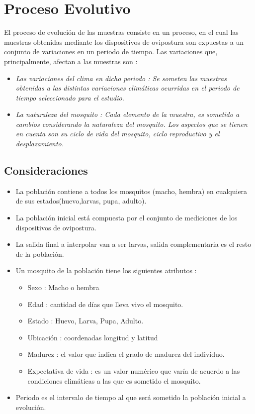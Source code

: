 \section{Proceso Evolutivo}
\label{sec:solucion-evolutivo}

El proceso de evolución de las muestras consiste en un proceso, en el cual
las muestras obtenidas mediante los dispositivos de ovipostura  son
expuestas a un conjunto de variaciones en un periodo de tiempo. Las
variaciones que, principalmente, afectan a las muestras son :

\begin{itemize}
    \item \em Las variaciones del clima en dicho periodo \rm: Se someten
    las muestras obtenidas a las distintas variaciones climáticas ocurridas
    en el periodo de tiempo seleccionado para el estudio.
    \item \em La naturaleza del mosquito \rm: Cada elemento de la muestra,
    es sometido a cambios considerando la naturaleza del mosquito. Los
    aspectos que se tienen en cuenta son su ciclo de vida del mosquito,
    ciclo reproductivo y el desplazamiento.
\end{itemize}


\subsection{Consideraciones}

\begin{itemize}
    \item La población contiene a todos los mosquitos (macho, hembra)
    en cualquiera de sus estados(huevo,larvas, pupa, adulto).
    \item La población inicial está compuesta por el conjunto de mediciones
    de los dispositivos de ovipostura.
    \item La salida final a interpolar van a ser larvas, salida complementaria
    es el resto de la población.
    \item Un mosquito de la población tiene los siguientes atributos :
        \begin{itemize}
            \item Sexo : Macho o hembra
            \item Edad : cantidad de días que lleva vivo el mosquito.
            \item Estado : Huevo, Larva, Pupa, Adulto.
            \item Ubicación : coordenadas longitud y latitud
            \item Madurez : el valor que indica el grado de madurez del individuo.
            \item Expectativa de vida : es un valor numérico que varía de
                acuerdo a las condiciones climáticas a las que es sometido
                el mosquito.
        \end{itemize}
   \item Periodo es el intervalo de tiempo al que será sometido la población inicial a evolución.
\end{itemize}


